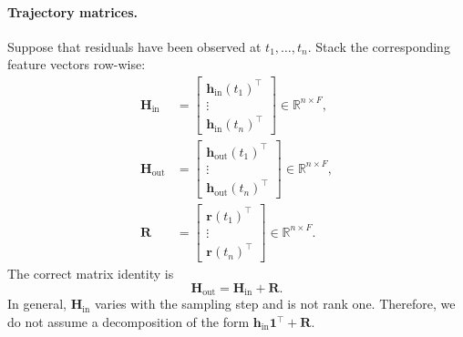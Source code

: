 \paragraph{Trajectory matrices.}
Suppose that residuals have been observed at
$t_1,\ldots,t_n$. Stack the corresponding feature vectors row-wise:
\begin{align}
\mathbf{H}_{\mathrm{in}}
&=
\begin{bmatrix}
\mathbf{h}_{\mathrm{in}}(t_1)^\top\\
\vdots\\
\mathbf{h}_{\mathrm{in}}(t_n)^\top
\end{bmatrix}
\in\mathbb{R}^{n\times F},
\\
\mathbf{H}_{\mathrm{out}}
&=
\begin{bmatrix}
\mathbf{h}_{\mathrm{out}}(t_1)^\top\\
\vdots\\
\mathbf{h}_{\mathrm{out}}(t_n)^\top
\end{bmatrix}
\in\mathbb{R}^{n\times F},
\\
\mathbf{R}
&=
\begin{bmatrix}
\mathbf{r}(t_1)^\top\\
\vdots\\
\mathbf{r}(t_n)^\top
\end{bmatrix}
\in\mathbb{R}^{n\times F}.
\end{align}
The correct matrix identity is
\begin{equation}
\mathbf{H}_{\mathrm{out}}
=
\mathbf{H}_{\mathrm{in}}
+
\mathbf{R}.
\label{eq:state-residual-matrix}
\end{equation}
In general, $\mathbf{H}_{\mathrm{in}}$ varies with the sampling step
and is not rank one. Therefore, we do not assume a decomposition of the
form
$\mathbf{h}_{\mathrm{in}}\mathbf{1}^\top+\mathbf{R}$.

